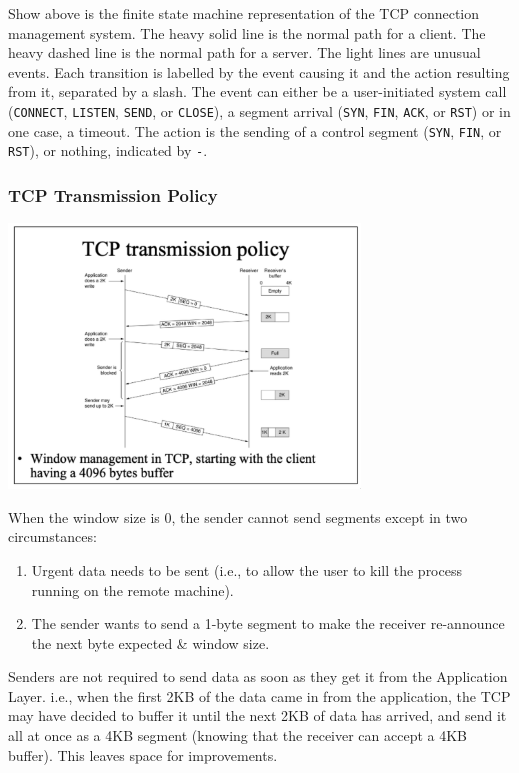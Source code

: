 \documentclass[11pt]{article}
\begin{document}
Show above is the finite state machine representation of the TCP connection management system. 
The heavy solid line is the normal path for a client. 
The heavy dashed line is the normal path for a server. 
The light lines are unusual events. 
Each transition is labelled by the event causing it and the action resulting from it, separated by a slash. 
The event can either be a user-initiated system call (\verb|CONNECT|, \verb|LISTEN|, \verb|SEND|, or \verb|CLOSE|), 
a segment arrival (\verb|SYN|, \verb|FIN|, \verb|ACK|, or \verb|RST|) or in one case, a timeout. 
The action is the sending of a control segment (\verb|SYN|, \verb|FIN|, or \verb|RST|), or nothing, indicated by \verb|-|. 

\subsubsection{TCP Transmission Policy}
\begin{center}
    \includegraphics[width=0.7\textwidth]{tcptransmissionpolicy0.png}
\end{center}

When the window size is 0, the sender cannot send segments except in two circumstances:
\begin{enumerate}
    \item   Urgent data needs to be sent (i.e., to allow the user to kill the process running on the remote machine). 
    \item   The sender wants to send a 1-byte segment to make the receiver re-announce the next byte expected \& window size. 
\end{enumerate}

Senders are not required to send data as soon as they get it from the Application Layer. 
i.e., when the first 2KB of the data came in from the application, the TCP may have decided to buffer it until the next 2KB of data has arrived, and send it all at once as a 4KB segment (knowing that the 
receiver can accept a 4KB buffer). 
This leaves space for improvements. 
\end{document}
